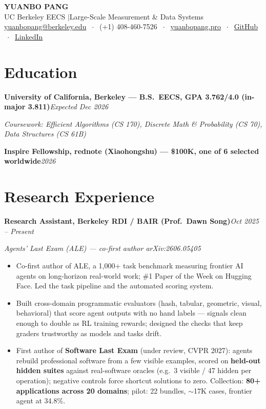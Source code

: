 \documentclass[10pt, letterpaper]{article}
\newcommand{\role}[2]{%
  \vspace{4pt}%
  \noindent\textbf{#1}\hfill\textit{#2}\par
}
\newcommand{\rolesub}[1]{%
  \noindent\textit{#1}\par\vspace{1pt}%
}
\begin{document}
\begin{center}
  {\LARGE\bfseries YUANBO PANG}\\[3pt]
  {\large UC Berkeley EECS \quad$\vert$\quad Large-Scale Measurement \& Data Systems}\\[3pt]
  \href{mailto:yuanbopang@berkeley.edu}{yuanbopang@berkeley.edu}
  $\;\cdot\;$ (+1) 408-460-7526
  $\;\cdot\;$ \href{https://www.yuanbopang.pro}{yuanbopang.pro}
  $\;\cdot\;$ \href{https://github.com/yuanboP}{GitHub}
  $\;\cdot\;$ \href{https://www.linkedin.com/in/yuanbopang/}{LinkedIn}
\end{center}

\section{Education}
\role{University of California, Berkeley --- B.S.\ EECS, GPA 3.762/4.0 (in-major 3.811)}{Expected Dec 2026}
\rolesub{Coursework: Efficient Algorithms (CS 170), Discrete Math \& Probability (CS 70), Data Structures (CS 61B)}
\role{Inspire Fellowship, rednote (Xiaohongshu) --- \$100K, one of 6 selected worldwide}{2026}

\section{Research Experience}

\role{Research Assistant, Berkeley RDI / BAIR (Prof.\ Dawn Song)}{Oct 2025 -- Present}
\rolesub{Agents' Last Exam (ALE) --- co-first author \quad arXiv:2606.05405}
\begin{itemize}
  \item Co-first author of ALE, a 1,000+ task benchmark measuring frontier AI agents on long-horizon real-world work; \#1 Paper of the Week on Hugging Face. Led the task pipeline and the automated scoring system.
  \item Built cross-domain programmatic evaluators (hash, tabular, geometric, visual, behavioral) that score agent outputs with no hand labels --- signals clean enough to double as RL training rewards; designed the checks that keep graders trustworthy as models and tasks drift.
  \item First author of \textbf{Software Last Exam} (under review, CVPR 2027): agents rebuild professional software from a few visible examples, scored on \textbf{held-out hidden suites} against real-software oracles (e.g.\ 3 visible / 47 hidden per operation); negative controls force shortcut solutions to zero. Collection: \textbf{80+ applications across 20 domains}; pilot: 22 bundles, $\sim$17K cases, frontier agent at 34.8\%.
\end{itemize}
\end{document}
